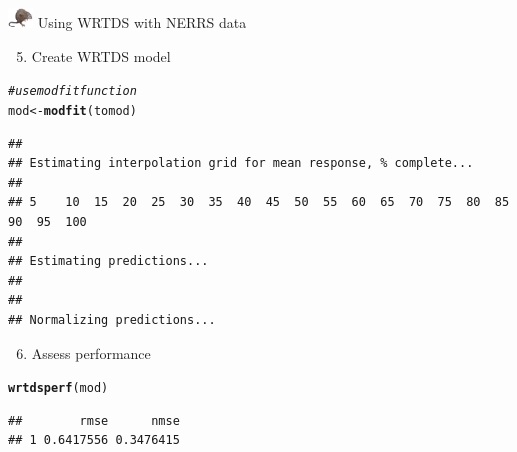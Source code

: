 \documentclass[xcolor=dvipsnames,serif]{beamer}\usepackage[]{graphicx}\usepackage[]{color}
\makeatletter
\newcommand{\hlcom}[1]{\textcolor[rgb]{0.678,0.584,0.686}{\textit{#1}}}%
\newcommand{\hlstd}[1]{\textcolor[rgb]{0.345,0.345,0.345}{#1}}%
\newcommand{\hlkwb}[1]{\textcolor[rgb]{0.69,0.353,0.396}{#1}}%
\newcommand{\hlkwd}[1]{\textcolor[rgb]{0.737,0.353,0.396}{\textbf{#1}}}%
\newenvironment{kframe}{%
 \def\at@end@of@kframe{}%
 \ifinner\ifhmode%
  \def\at@end@of@kframe{\end{minipage}}%
  \begin{minipage}{\columnwidth}%
 \fi\fi%
 \def\FrameCommand##1{\hskip\@totalleftmargin \hskip-\fboxsep
 \colorbox{shadecolor}{##1}\hskip-\fboxsep
     \hskip-\linewidth \hskip-\@totalleftmargin \hskip\columnwidth}%
 \MakeFramed {\advance\hsize-\width
   \@totalleftmargin\z@ \linewidth\hsize
   \@setminipage}}%
 {\par\unskip\endMakeFramed%
 \at@end@of@kframe}
\newenvironment{knitrout}{}{} %
\makeatother
\begin{document}
\begin{frame}[t, fragile]{\includegraphics[width = 0.05\textwidth]{imgs/swmprat.png} Using WRTDS with NERRS data}{}
\begin{enumerate}
\setcounter{enumi}{4}
\item<1-> Create WRTDS model
\end{enumerate}
\begin{knitrout}\scriptsize
{}\color{fgcolor}\begin{kframe}
\begin{alltt}
\hlcom{# use modfit function}
\hlstd{mod} \hlkwb{<-} \hlkwd{modfit}\hlstd{(tomod)}
\end{alltt}
\begin{verbatim}
## 
## Estimating interpolation grid for mean response, % complete...
## 
## 5 	10 	15 	20 	25 	30 	35 	40 	45 	50 	55 	60 	65 	70 	75 	80 	85 	90 	95 	100 	
## 
## Estimating predictions... 
## 
## 
## Normalizing predictions...
\end{verbatim}
\end{kframe}
\end{knitrout}
\begin{enumerate}
\setcounter{enumi}{5}
\item<1-> Assess performance
\end{enumerate}
\begin{knitrout}\scriptsize
{}\color{fgcolor}\begin{kframe}
\begin{alltt}
\hlkwd{wrtdsperf}\hlstd{(mod)}
\end{alltt}
\begin{verbatim}
##        rmse      nmse
## 1 0.6417556 0.3476415
\end{verbatim}
\end{kframe}
\end{knitrout}
\end{frame}
\end{document}
